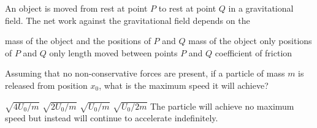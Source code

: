 \documentclass{../../oss-apphys-exam}
\begin{document}
\begin{multicols*}{2}
\begin{questions}
    \question An object is moved from rest at point $P$ to rest at point $Q$ in
    a gravitational field. The net work against the gravitational field depends
    on the
    \begin{choices}
      \choice mass of the object and the positions of $P$ and $Q$
      \choice mass of the object only
      \choice positions of $P$ and $Q$ only
      \choice length moved between points $P$ and $Q$
      \choice coefficient of friction
    \end{choices}
    
    

    \question Assuming that no non-conservative forces are present, if a
    particle of mass $m$ is released from position $x_0$, what is the maximum
    speed it will achieve?
    \label{q:well1}
    \begin{choices}
      \choice $\sqrt{4U_0/m}$
      \choice $\sqrt{2U_0/m}$
      \choice $\sqrt{U_0/m}$
      \choice $\sqrt{U_0/2m}$
      \choice The particle will achieve no maximum speed but instead will
      continue to accelerate indefinitely.
    \end{choices}
    

\end{questions}
\end{multicols*}
\end{document}
